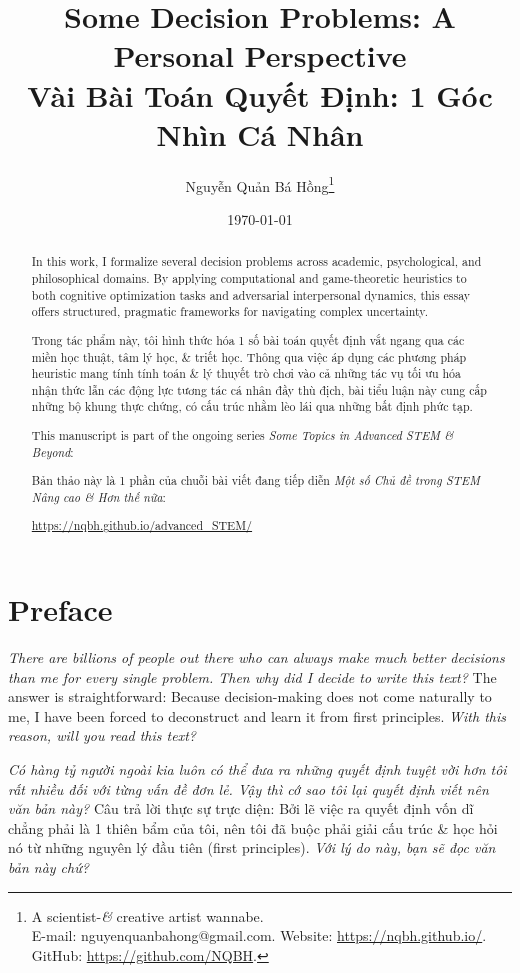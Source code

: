 \documentclass{article}
\title{Some Decision Problems: A Personal Perspective\\ Vài Bài Toán Quyết Định: 1 Góc Nhìn Cá Nhân}
\author{Nguyễn Quản Bá Hồng\footnote{A scientist-\textit{\&} creative artist wannabe.\\E-mail: \sf nguyenquanbahong@gmail.com. Website: \url{https://nqbh.github.io/}. GitHub: \url{https://github.com/NQBH}.}}
\date{\today}
\begin{document}
\maketitle

\begin{abstract}
	In this work, I formalize several decision problems across academic, psychological, and philosophical domains. By applying computational and game-theoretic heuristics to both cognitive optimization tasks and adversarial interpersonal dynamics, this essay offers structured, pragmatic frameworks for navigating complex uncertainty.
	
	Trong tác phẩm này, tôi hình thức hóa 1 số bài toán quyết định vắt ngang qua các miền học thuật, tâm lý học, \& triết học. Thông qua việc áp dụng các phương pháp heuristic mang tính tính toán \& lý thuyết trò chơi vào cả những tác vụ tối ưu hóa nhận thức lẫn các động lực tương tác cá nhân đầy thù địch, bài tiểu luận này cung cấp những bộ khung thực chứng, có cấu trúc nhằm lèo lái qua những bất định phức tạp.
	
	This manuscript is part of the ongoing series \textit{Some Topics in Advanced STEM \& Beyond}:
	
	Bản thảo này là 1 phần của chuỗi bài viết đang tiếp diễn \textit{Một số Chủ đề trong STEM Nâng cao \& Hơn thế nữa}:
	\begin{center}
		\url{https://nqbh.github.io/advanced_STEM/}
	\end{center}
\end{abstract}

\tableofcontents
\clearpage

\section{Preface}

\textit{There are billions of people out there who can always make much better decisions than me for every single problem. Then why did I decide to write this text?} The answer is straightforward: Because decision-making does not come naturally to me, I have been forced to deconstruct and learn it from first principles. \textit{With this reason, will you read this text?}

\textit{Có hàng tỷ người ngoài kia luôn có thể đưa ra những quyết định tuyệt vời hơn tôi rất nhiều đối với từng vấn đề đơn lẻ. Vậy thì cớ sao tôi lại quyết định viết nên văn bản này?} Câu trả lời thực sự trực diện: Bởi lẽ việc ra quyết định vốn dĩ chẳng phải là 1 thiên bẩm của tôi, nên tôi đã buộc phải giải cấu trúc \& học hỏi nó từ những nguyên lý đầu tiên (first principles). \textit{Với lý do này, bạn sẽ đọc văn bản này chứ?}
\end{document}
